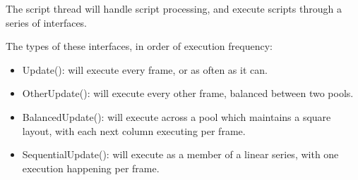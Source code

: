 The script thread will handle script processing, and execute scripts through a series of interfaces.

The types of these interfaces, in order of execution frequency:

\begin{itemize}
    \item Update(): will execute every frame, or as often as it can.
    \item OtherUpdate(): will execute every other frame, balanced between two pools.
    \item BalancedUpdate(): will execute across a pool which maintains a square layout, with each next column executing per frame.
    \item SequentialUpdate(): will execute as a member of a linear series, with one execution happening per frame. 
\end{itemize}